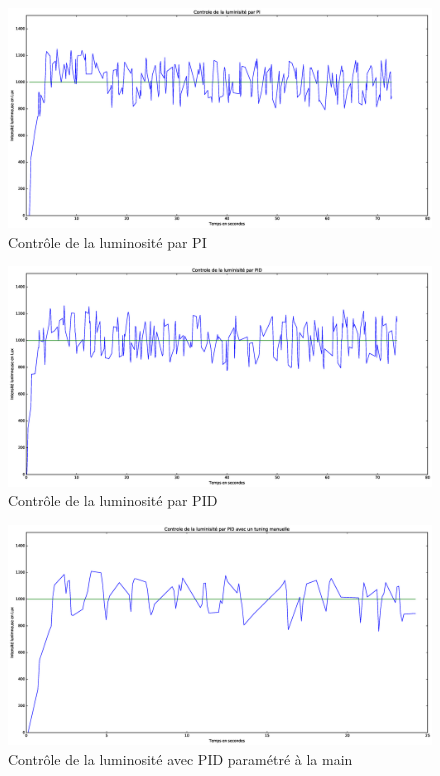 \documentclass[a4paper,10pt]{report}
\begin{document}
\begin{appendices}
\begin{figure}[htb!]
   \centering
   \includegraphics[scale=0.35]{PI.eps}
   \caption{\label{fig:pi} Contrôle de la luminosité par PI}
\end{figure}

\begin{figure}[htb!]
   \centering
   \includegraphics[scale=0.35]{PID.eps}
   \caption{\label{fig:pid} Contrôle de la luminosité par PID}
\end{figure}

\begin{figure}[htb!]
   \centering
   \includegraphics[scale=0.35]{Manuelle.eps}
   \caption{\label{fig:manuelle} Contrôle de la luminosité avec PID paramétré à la main}
\end{figure}


\end{appendices}
\end{document}
